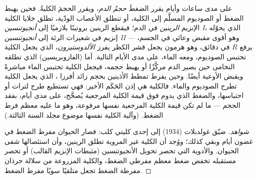 \begin{proposition}\label{prop:b2:blood-pressure:raas}
على مدى ساعات وأيام يقرر الضغطَ \emph{حجمُ الدم}،
ويقرر الحجمَ الكليةُ. فحين يهبط الضغط أو الصوديوم
المسلَّم إلى الكلية، أو تنطلق الأعصاب الودّية، تطلق خلايا
 الكلية الإنزيم \emph{الرينين} في
الدم؛ فيقطع الرينين بروتينًا بلازميًا إلى \emph{أنجيوتنسين I}، الذي
يحوّله إنزيم في شعيرات الرئة إلى \emph{أنجيوتنسين II}
--- وهو أقوى مقبض وعائي في الجسم، يرفع $R$ في
دقائق، وهو هرمون يجعل قشر الكظر يفرز
\emph{الألدوستيرون}، الذي يجعل الكلية تحتبس الصوديوم، ومعه
الماء، على مدى الأيام التالية. أما \emph{}
(الفازوبريسين) الذي تطلقه النخامى حين يصير الدم
مركَّزًا أو يهبط حجمه، فيجعل الكلية تحتبس
الماء مباشرةً ويقبض الأوعية أيضًا. وحين يفرط تمطط الأذينين
بحجم زائد أفرزا \emph{}، الذي يجعل الكلية تطرح الصوديوم والماء. فالكلية
هي إذن الحَكَم الأخير: فهي تستطيع طرح لترات أو احتباسها،
والضغط الذي يدوم فوق قيمة الكلية المرجعية
يُصحَّح، على مدى أيام، بفقد الحجم --- ما لم تكن قيمة الكلية
المرجعية نفسها مرفوعة، وهو ما عليه معظم فرط الضغط.
(وآلية الكلية نفسها موضوع مجلد السنة الثالثة.)
\end{proposition}
\begin{proof}[شواهد]
ضيّق غولدبلات (1934)  إلى إحدى كليتي كلب: فصار
الحيوان مفرط الضغط في غضون أيام وبقي كذلك؛ ووُجد أن
الكلية غير المروية تطلق الرينين، وأن استئصالها
شفى الحيوان. والأدوية التي تحصر تحويل الأنجيوتنسين
(مثبطات الإنزيم القالب) أو تحصر مستقبله تخفض ضغط معظم
مفرطي الضغط، والكلية المزروعة من سلالة جرذان مفرطة
الضغط تجعل متلقيًا سويًا مفرط الضغط.
\end{proof}

